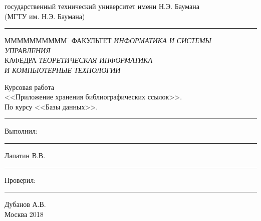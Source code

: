 \begin{titlepage}	%

\begin{center}	
 государственный технический университет имени Н.Э. Баумана\\
\large {(МГТУ им. Н.Э. Баумана)}\\[0.4cm] 
\rule[+3mm]{7.5cm}{0.80mm}
\begin{flushleft}
\begin{tabbing}
ММММММММММ \= \kill
\large{ФАКУЛЬТЕТ} \> \large{\textit{ИНФОРМАТИКА И СИСТЕМЫ}} \\ \> \large{\textit{УПРАВЛЕНИЯ}} \\	\large{КАФЕДРА} \> \large{\textit{ТЕОРЕТИЧЕСКАЯ ИНФОРМАТИКА}} \\
 \> \large{\textit{И КОМПЬЮТЕРНЫЕ ТЕХНОЛОГИИ}}
\\[1.0cm]
\end{tabbing}
\end{flushleft}
\end{center}


\begin{center}


\Huge{Курсовая работа}\\
\LARGE{<<Приложение хранения библиографических ссылок>>.}
\\[0.5cm]
\LARGE{По курсу <<Базы данных>>.}
\\[2.0cm]




 \rule[+0mm]{5.4cm}{0.0mm}Выполнил:  \rule[+0mm]{1.3cm}{0.0mm} Лапатин В.В.\\
 \rule[+0mm]{5.4cm}{0.0mm}Проверил:  \rule[+0mm]{1.1cm}{0.0mm} Дубанов А.В.\\ [3.5cm]



\large{Москва 2018}
\end{center}
\thispagestyle{empty} %
\end{titlepage} %